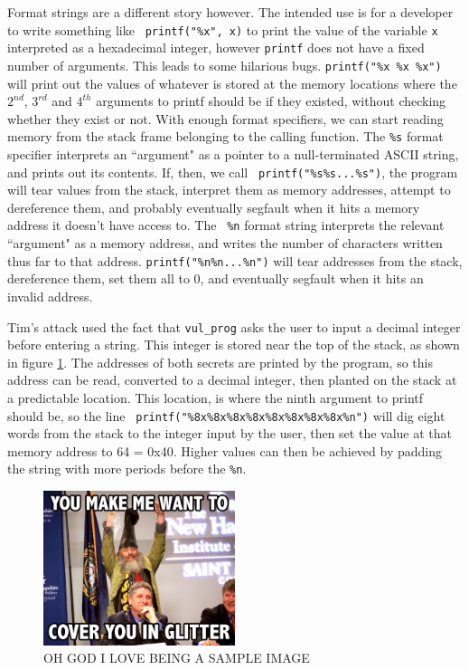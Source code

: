Format strings are a different story however. The intended use is for a developer to write something like {\tt
printf("\%x", x)} to print the value of the variable {\tt x} interpreted as a hexadecimal integer, however {\tt printf}
does not have a fixed number of arguments. This leads to some hilarious bugs. {\tt printf("\%x \%x \%x")} will print out
the values of whatever is stored at the memory locations where the $2^{nd}$, $3^{rd}$ and $4^{th}$ arguments to printf
should be if they existed, without checking whether they exist or not. With enough format specifiers, we can start
reading memory from the stack frame belonging to the calling function. The {\tt \%s} format specifier interprets an
``argument" as a pointer to a null-terminated ASCII string, and prints out its contents. If, then, we call {\tt
printf("\%s\%s...\%s")}, the program will tear values from the stack, interpret them as memory addresses, attempt to
dereference them, and probably eventually segfault when it hits a memory address it doesn't have access to. The {\tt
\%n} format string interprets the relevant ``argument" as a memory address, and writes the number of characters written
thus far to that address. {\tt printf("\%n\%n...\%n")} will tear addresses from the stack, dereference them, set them
all to 0, and eventually segfault when it hits an invalid address.

Tim's attack used the fact that {\tt vul\_prog} asks the user to input a decimal integer before entering a string. This
integer is stored near the top of the stack, as shown in figure \ref{fig_vul_prog_stack}. The addresses of both secrets
are printed by the program, so this address can be read, converted to a decimal integer, then planted on the stack at a
predictable location. This location, is where the ninth argument to printf should be, so the line {\tt
printf("\%8x\%8x\%8x\%8x\%8x\%8x\%8x\%8x\%n")} will dig eight words from the stack to the integer input by the user,
then set the value at that memory address to 64 = 0x40. Higher values can then be achieved by padding the string with
more periods before the {\tt \%n}.


\begin{figure}[ht]
    \centering
    \includegraphics[width = 0.5\textwidth]{./images/placeholder.jpg}
    \caption{OH GOD I LOVE BEING A SAMPLE IMAGE}
    \label{fig_vul_prog_stack}
\end{figure}

